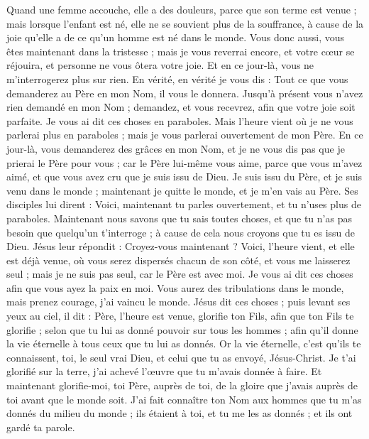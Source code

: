 \begin{multicols}{2}
Quand une femme accouche, elle a des douleurs, parce que son terme est venue ; mais lorsque l'enfant est né, elle ne se souvient plus de la souffrance, à cause de la joie qu'elle a de ce qu'un homme est né dans le monde.
Vous donc aussi, vous êtes maintenant dans la tristesse ; mais je vous reverrai encore, et votre cœur se réjouira, et personne ne vous ôtera votre joie.
Et en ce jour-là, vous ne m'interrogerez plus sur rien. En vérité, en vérité je vous dis : Tout ce que vous demanderez au Père en mon Nom, il vous le donnera.
Jusqu'à présent vous n'avez rien demandé en mon Nom ; demandez, et vous recevrez, afin que votre joie soit parfaite.
Je vous ai dit ces choses en paraboles. Mais l'heure vient où je ne vous parlerai plus en paraboles ; mais je vous parlerai ouvertement de mon Père.
En ce jour-là, vous demanderez des grâces en mon Nom, et je ne vous dis pas que je prierai le Père pour vous ;
car le Père lui-même vous aime, parce que vous m'avez aimé, et que vous avez cru que je suis issu de Dieu.
Je suis issu du Père, et je suis venu dans le monde ; maintenant je quitte le monde, et je m'en vais au Père.
Ses disciples lui dirent : Voici, maintenant tu parles ouvertement, et tu n'uses plus de paraboles.
Maintenant nous savons que tu sais toutes choses, et que tu n'as pas besoin que quelqu'un t'interroge ; à cause de cela nous croyons que tu es issu de Dieu.
Jésus leur répondit : Croyez-vous maintenant ?
Voici, l'heure vient, et elle est déjà venue, où vous serez dispersés chacun de son côté, et vous me laisserez seul ; mais je ne suis pas seul, car le Père est avec moi.
Je vous ai dit ces choses afin que vous ayez la paix en moi. Vous aurez des tribulations dans le monde, mais prenez courage, j'ai vaincu le monde.
\VerseOne{}Jésus dit ces choses ; puis levant ses yeux au ciel, il dit : Père, l'heure est venue, glorifie ton Fils, afin que ton Fils te glorifie ;
selon que tu lui as donné pouvoir sur tous les hommes ; afin qu'il donne la vie éternelle à tous ceux que tu lui as donnés.
Or la vie éternelle, c'est qu'ils te connaissent, toi, le seul vrai Dieu, et celui que tu as envoyé, Jésus-Christ.
Je t'ai glorifié sur la terre, j'ai achevé l'œuvre que tu m'avais donnée à faire.
Et maintenant glorifie-moi, toi Père, auprès de toi, de la gloire que j'avais auprès de toi avant que le monde soit.
J'ai fait connaître ton Nom aux hommes que tu m'as donnés du milieu du monde ; ils étaient à toi, et tu me les as donnés ; et ils ont gardé ta parole.

\end{multicols}
